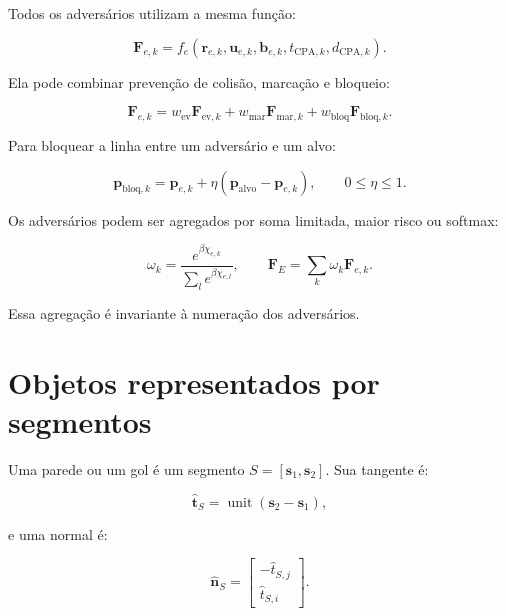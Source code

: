 \documentclass[12pt,a4paper]{article}
\newcommand{\vect}[1]{\boldsymbol{#1}}
\newcommand{\unit}[1]{\widehat{\vect{#1}}}
\begin{document}
Todos os advers\'arios utilizam a mesma fun\c{c}\~ao:

\begin{equation}
  \vect{F}_{e,k}=f_e(\vect{r}_{e,k},\vect{u}_{e,k},\vect{b}_{e,k},t_{\mathrm{CPA},k},d_{\mathrm{CPA},k}).
\end{equation}

Ela pode combinar preven\c{c}\~ao de colis\~ao, marca\c{c}\~ao e bloqueio:

\begin{equation}
  \vect{F}_{e,k}=w_{\mathrm{ev}}\vect{F}_{\mathrm{ev},k}
  +w_{\mathrm{mar}}\vect{F}_{\mathrm{mar},k}
  +w_{\mathrm{bloq}}\vect{F}_{\mathrm{bloq},k}.
\end{equation}

Para bloquear a linha entre um advers\'ario e um alvo:

\begin{equation}
  \vect{p}_{\mathrm{bloq},k}=\vect{p}_{e,k}+\eta(\vect{p}_{\mathrm{alvo}}-\vect{p}_{e,k}),\qquad 0\leq\eta\leq1.
\end{equation}

Os advers\'arios podem ser agregados por soma limitada, maior risco ou softmax:

\begin{equation}
  \omega_k=\frac{e^{\beta\chi_{e,k}}}{\sum_l e^{\beta\chi_{e,l}}},\qquad
  \vect{F}_E=\sum_k\omega_k\vect{F}_{e,k}.
\end{equation}

Essa agrega\c{c}\~ao \'e invariante \`a numera\c{c}\~ao dos advers\'arios.

\section{Objetos representados por segmentos}

Uma parede ou um gol \'e um segmento $S=[\vect{s}_1,\vect{s}_2]$. Sua tangente \'e:

\begin{equation}
  \unit{t}_S=\operatorname{unit}(\vect{s}_2-\vect{s}_1),
\end{equation}

e uma normal \'e:

\begin{equation}
  \unit{n}_S=\begin{bmatrix}-\widehat{t}_{S,j}\\\widehat{t}_{S,i}\end{bmatrix}.
\end{equation}
\end{document}
